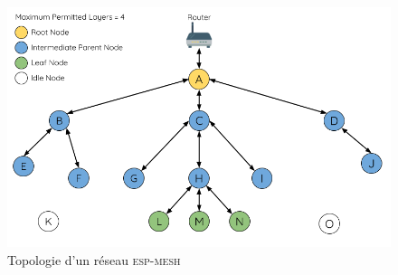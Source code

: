 \documentclass[a4paper, 12pt]{report}
\newcommand{\espmesh}{\textsc{esp-mesh}}
\begin{document}
        \begin{figure}[H]
            \centering
            \includegraphics[scale=0.3]{images/mesh-node-types.png}
            \caption{Topologie d'un réseau \espmesh \cite{esp-mesh_w}}
        \end{figure}
\end{document}
